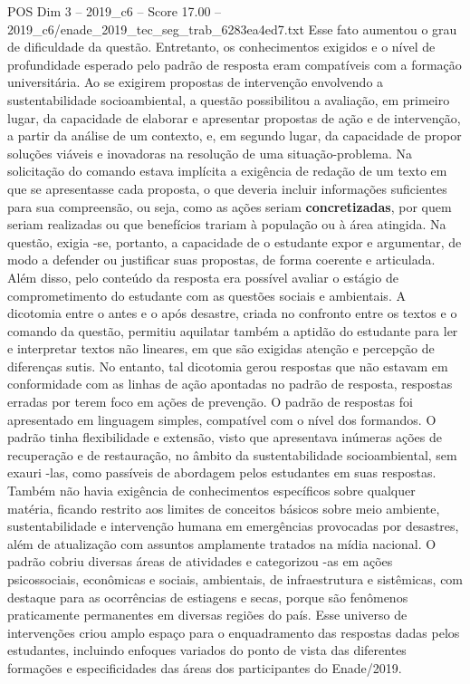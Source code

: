 \begin{textsample}{POS Dim 3 – 2019\_c6 – Score 17.00 – 2019\_c6/enade\_2019\_tec\_seg\_trab\_6283ea4ed7.txt}
Esse fato aumentou o grau de dificuldade da questão.
Entretanto, os conhecimentos exigidos e o nível de profundidade esperado pelo padrão de resposta eram compatíveis com a formação universitária.
Ao se exigirem propostas de intervenção envolvendo a sustentabilidade socioambiental, a questão possibilitou a avaliação, em primeiro lugar, da capacidade de elaborar e apresentar propostas de ação e de intervenção, a partir da análise de um contexto, e, em segundo lugar, da capacidade de propor soluções viáveis e inovadoras na resolução de uma situação-problema.
Na solicitação do comando estava implícita a exigência de redação de um texto em que se apresentasse cada proposta, o que deveria incluir informações suficientes para sua compreensão, ou seja, como as ações seriam \textbf{concretizadas}, por quem seriam realizadas ou que benefícios trariam à população ou à área atingida.
Na questão, exigia -se, portanto, a capacidade de o estudante expor e argumentar, de modo a defender ou justificar suas propostas, de forma coerente e articulada.
Além disso, pelo conteúdo da resposta era possível avaliar o estágio de comprometimento do estudante com as questões sociais e ambientais.
A dicotomia entre o antes e o após desastre, criada no confronto entre os textos e o comando da questão, permitiu aquilatar também a aptidão do estudante para ler e interpretar textos não lineares, em que são exigidas atenção e percepção de diferenças sutis.
No entanto, tal dicotomia gerou respostas que não estavam em conformidade com as linhas de ação apontadas no padrão de resposta, respostas erradas por terem foco em ações de prevenção.
O padrão de respostas foi apresentado em linguagem simples, compatível com o nível dos formandos.
O padrão tinha flexibilidade e extensão, visto que apresentava inúmeras ações de recuperação e de restauração, no âmbito da sustentabilidade socioambiental, sem exauri -las, como passíveis de abordagem pelos estudantes em suas respostas.
Também não havia exigência de conhecimentos específicos sobre qualquer matéria, ficando restrito aos limites de conceitos básicos sobre meio ambiente, sustentabilidade e intervenção humana em emergências provocadas por desastres, além de atualização com assuntos amplamente tratados na mídia nacional.
O padrão cobriu diversas áreas de atividades e categorizou -as em ações psicossociais, econômicas e sociais, ambientais, de infraestrutura e sistêmicas, com destaque para as ocorrências de estiagens e secas, porque são fenômenos praticamente permanentes em diversas regiões do país.
Esse universo de intervenções criou amplo espaço para o enquadramento das respostas dadas pelos estudantes, incluindo enfoques variados do ponto de vista das diferentes formações e especificidades das áreas dos participantes do Enade/2019.

\end{textsample}
